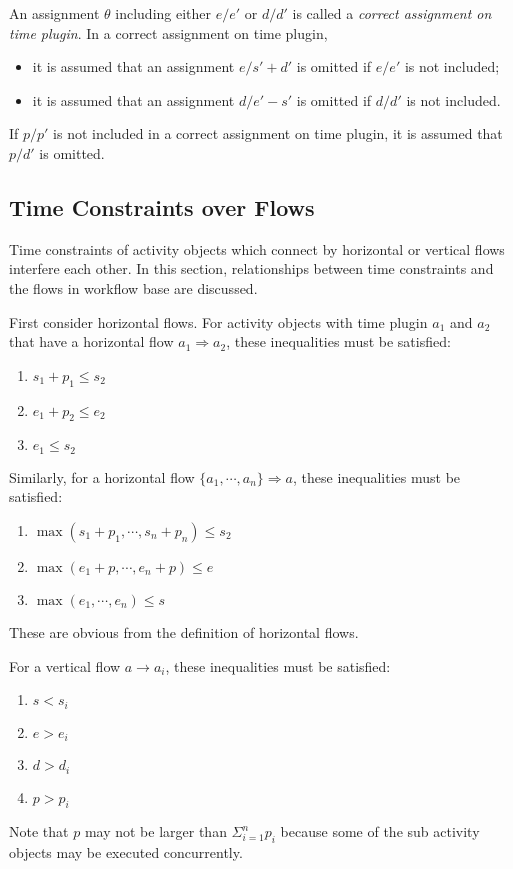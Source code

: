 An assignment $\theta$ including either $e/e'$ or $d/d'$ is called
a \emph{correct assignment on time plugin}.  In a correct assignment on
time plugin, 
\begin{itemize}
 \item it is assumed that an assignment $e/s'+d'$ is omitted if $e/e'$
       is not included;
 \item it is assumed that an assignment $d/e'-s'$ is omitted if $d/d'$
       is not included.
\end{itemize}
If $p/p'$ is not included in a correct assignment on time plugin, it is
assumed that $p/d'$ is omitted.

\subsection{Time Constraints over Flows}
\label{sec:tcFlows}

Time constraints of activity objects which connect by horizontal or
vertical flows interfere each other.  In this section, relationships between
time constraints and the flows in workflow base are discussed.

First consider horizontal flows.  For activity objects with time plugin
$a_1$ and $a_2$ that have a horizontal flow $a_1 \Longrightarrow a_2$,
these inequalities must be satisfied:
\begin{enumerate}
\setlength{\itemsep}{0mm}
\setlength{\parskip}{0mm}
 \item $s_1 + p_1 \leq s_2$
 \item $e_1 + p_2 \leq e_2$
 \item $e_1 \leq s_2$
\end{enumerate}
Similarly, for a horizontal flow $\{a_1, \cdots, a_n\} \Longrightarrow
a$, these inequalities must be satisfied:
\begin{enumerate}
\setlength{\itemsep}{0mm}
\setlength{\parskip}{0mm}
 \item $\max(s_1 + p_1, \cdots, s_n + p_n) \leq s_2$
 \item $\max(e_1 + p, \cdots, e_n + p) \leq e$
 \item $\max(e_1, \cdots, e_n) \leq s$
\end{enumerate}
These are obvious from the definition of horizontal flows.

For a vertical flow $a \longrightarrow a_i$, these inequalities must be
satisfied:
\begin{enumerate}
\setlength{\itemsep}{0mm}
\setlength{\parskip}{0mm}
 \item $s < s_i$
 \item $e > e_i$
 \item $d > d_i$
 \item $p > p_i$
\end{enumerate}
Note that $p$ may not be larger than $\Sigma_{i=1}^n p_i$ because some
of the sub activity objects may be executed concurrently.

